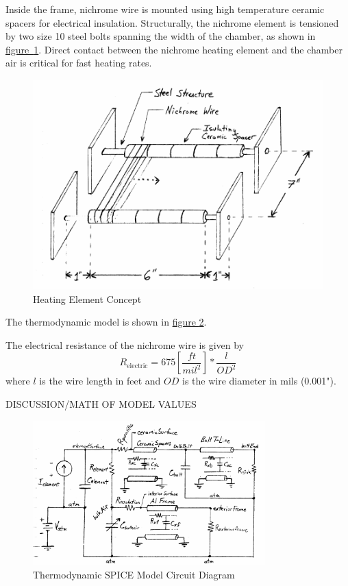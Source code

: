 \documentclass[10pt, twocolumn]{article}
\begin{document}
Inside the frame, nichrome wire is mounted using high temperature
ceramic spacers for electrical insulation. Structurally, the nichrome
element is tensioned by two size 10 steel bolts spanning the width of the
chamber, as shown in
\mbox{\hyperref[heating-element-concept]{figure \ref{heating-element-concept}}}.
Direct contact between the nichrome heating element and the chamber air
is critical for fast heating rates.

\begin{figure}
	\centering
	\includegraphics[width=\columnwidth]{Figures/heating-element-concept.pdf}
	\caption{Heating Element Concept}
	\label{heating-element-concept}
\end{figure}

The thermodynamic model is shown in
\hyperref[thermodynamic-spice-circuit]{figure \ref{thermodynamic-spice-circuit}}.

The electrical resistance of the nichrome wire is given by
\begin{equation*}
R_{\textrm{electric}}=675\left[\frac{ft}{mil^{2}}\right]*
\frac{l}{OD^{2}}
\end{equation*}
where $l$ is the wire length in feet and $OD$ is the wire diameter in mils (0.001").

DISCUSSION/MATH OF MODEL VALUES

\begin{figure}
	\centering
	\includegraphics[width=0.8\textwidth]{Figures/thermodynamic-spice-circuit.pdf}
	\caption{Thermodynamic SPICE Model Circuit Diagram}
	\label{thermodynamic-spice-circuit}
\end{figure}
\end{document}
